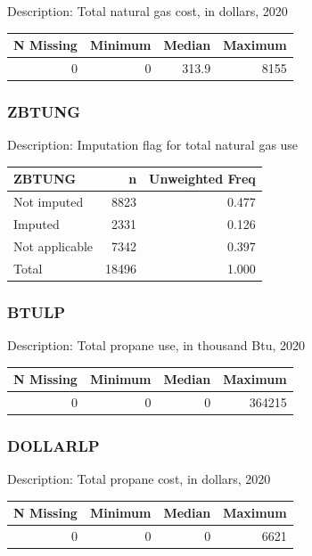 \documentclass[
]{krantz}
\begin{document}
Description: Total natural gas cost, in dollars, 2020

\begin{tabular}[t]{r|r|r|r}
\hline
N Missing & Minimum & Median & Maximum\\
\hline
0 & 0 & 313.9 & 8155\\
\hline
\end{tabular}

\hypertarget{zbtung}{%
\subsubsection*{ZBTUNG}\label{zbtung}}


Description: Imputation flag for total natural gas use

\begin{tabular}[t]{l|r|r}
\hline
ZBTUNG & n & Unweighted Freq\\
\hline
Not imputed & 8823 & 0.477\\
\hline
Imputed & 2331 & 0.126\\
\hline
Not applicable & 7342 & 0.397\\
\hline
Total & 18496 & 1.000\\
\hline
\end{tabular}

\hypertarget{btulp}{%
\subsubsection*{BTULP}\label{btulp}}


Description: Total propane use, in thousand Btu, 2020

\begin{tabular}[t]{r|r|r|r}
\hline
N Missing & Minimum & Median & Maximum\\
\hline
0 & 0 & 0 & 364215\\
\hline
\end{tabular}

\hypertarget{dollarlp}{%
\subsubsection*{DOLLARLP}\label{dollarlp}}


Description: Total propane cost, in dollars, 2020

\begin{tabular}[t]{r|r|r|r}
\hline
N Missing & Minimum & Median & Maximum\\
\hline
0 & 0 & 0 & 6621\\
\hline
\end{tabular}
\end{document}
